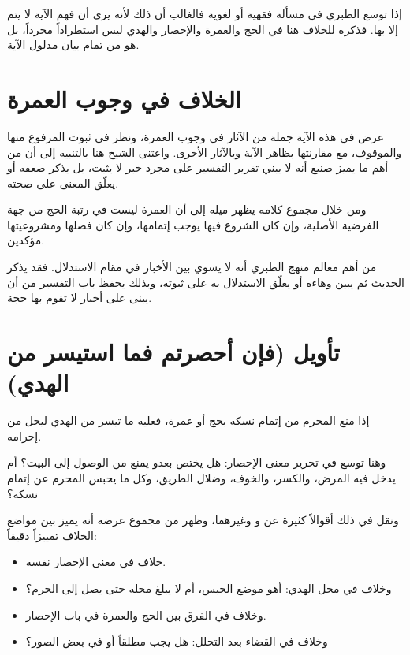\begin{fawaid}
إذا توسع الطبري في مسألة فقهية أو لغوية فالغالب أن ذلك لأنه يرى أن فهم الآية لا يتم إلا بها. فذكره للخلاف هنا في الحج والعمرة والإحصار والهدي ليس استطراداً مجرداً، بل هو من تمام بيان مدلول الآية.
\end{fawaid}

\section{الخلاف في وجوب العمرة}
عرض  في هذه الآية جملة من الآثار في وجوب العمرة، ونظر في ثبوت المرفوع منها والموقوف، مع مقارنتها بظاهر الآية وبالآثار الأخرى. واعتنى الشيخ هنا بالتنبيه إلى أن من أهم ما يميز صنيع  أنه لا يبني تقرير التفسير على مجرد خبر لا يثبت، بل يذكر ضعفه أو يعلّق المعنى على صحته.

ومن خلال مجموع كلامه يظهر ميله إلى أن العمرة ليست في رتبة الحج من جهة الفرضية الأصلية، وإن كان الشروع فيها يوجب إتمامها، وإن كان فضلها ومشروعيتها مؤكدين.

\begin{fawaid}
من أهم معالم منهج الطبري أنه لا يسوي بين الأخبار في مقام الاستدلال. فقد يذكر الحديث ثم يبين وهاءه أو يعلّق الاستدلال به على ثبوته، وبذلك يحفظ باب التفسير من أن يبنى على أخبار لا تقوم بها حجة.
\end{fawaid}

\separator

\section{تأويل (فإن أحصرتم فما استيسر من الهدي)}
 إذا منع المحرم من إتمام نسكه بحج أو عمرة، فعليه ما تيسر من الهدي ليحل من إحرامه.

وهنا توسع  في تحرير معنى الإحصار: هل يختص بعدو يمنع من الوصول إلى البيت؟ أم يدخل فيه المرض، والكسر، والخوف، وضلال الطريق، وكل ما يحبس المحرم عن إتمام نسكه؟

ونقل في ذلك أقوالاً كثيرة عن  و وغيرهما، وظهر من مجموع عرضه أنه يميز بين مواضع الخلاف تمييزاً دقيقاً:
\begin{itemize}
    \item خلاف في معنى الإحصار نفسه.
    \item وخلاف في محل الهدي: أهو موضع الحبس، أم لا يبلغ محله حتى يصل إلى الحرم؟
    \item وخلاف في الفرق بين الحج والعمرة في باب الإحصار.
    \item وخلاف في القضاء بعد التحلل: هل يجب مطلقاً أو في بعض الصور؟
\end{itemize}

